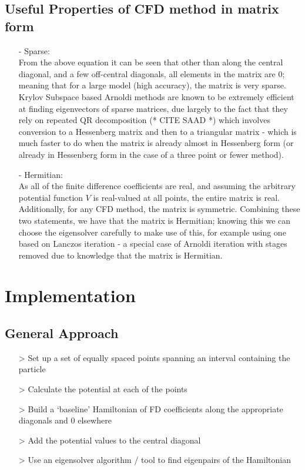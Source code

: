 \subsection{Useful Properties of CFD method in matrix form}
\begin{itemize}
\item[-]Sparse: \\ From the above equation it can be seen that other than along the central diagonal, and a few off-central diagonals, all elements in the matrix are $0$; meaning that for a large model (high accuracy), the matrix is very sparse. Krylov Subspace based Arnoldi methods are known to be extremely efficient at finding eigenvectors of sparse matrices, due largely to the fact that they rely on repeated QR decomposition (* CITE SAAD *) which involves conversion to a Hessenberg matrix and then to a triangular matrix - which is much faster to do when the matrix is already almost in Hessenberg form (or already in Hessenberg form in the case of a three point or fewer method).
\item[-]Hermitian: \\ As all of the finite difference coefficients are real, and assuming the arbitrary potential function $V$ is real-valued at all points, the entire matrix is real. Additionally, for any CFD method, the matrix is symmetric. Combining these two statements, we have that the matrix is Hermitian; knowing this we can choose the eigensolver carefully to make use of this, for example using one based on Lanczos iteration - a special case of Arnoldi iteration with stages removed due to knowledge that the matrix is Hermitian.
\end{itemize}

\section{Implementation}
\subsection{General Approach}
\begin{itemize}
    \item[>]{Set up a set of equally spaced points spanning an interval containing the particle}
    \item[>]{Calculate the potential at each of the points}
    \item[>]{Build a `baseline' Hamiltonian of FD coefficients along the appropriate diagonals and $0$ elsewhere}
    \item[>]{Add the potential values to the central diagonal}
    \item[>]{Use an eigensolver algorithm / tool to find eigenpairs of the Hamiltonian}
\end{itemize}

